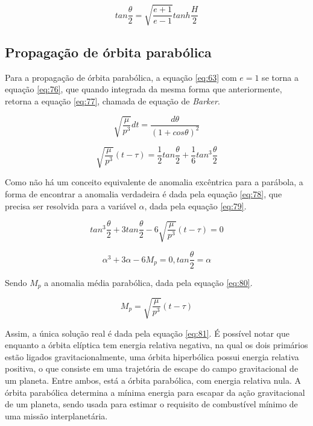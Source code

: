 \begin{equation}
    tan\frac{\theta}{2} = \sqrt{\frac{e+1}{e-1}}tanh\frac{H}{2}
    \label{eq:75}
\end{equation}

\subsection{Propagação de órbita parabólica}

Para a propagação de órbita parabólica, a equação \ref{eq:63} com $e = 1$ se torna a equação \ref{eq:76}, que quando integrada da mesma forma que anteriormente, retorna a equação \ref{eq:77}, chamada de equação de \textit{Barker}.

\begin{equation}
    \sqrt{\frac{\mu}{p^{3}}}dt = \frac{d\theta}{(1+cos\theta)^{2}}
   \label{eq:76} 
\end{equation}

\begin{equation}
    \sqrt{\frac{\mu}{p^{3}}}(t-\tau) = \frac{1}{2}tan\frac{\theta}{2}+\frac{1}{6}tan^{3}\frac{\theta}{2}
    \label{eq:77}
\end{equation}

Como não há um conceito equivalente de anomalia excêntrica para a parábola, a forma de encontrar a anomalia verdadeira é dada pela equação \ref{eq:78}, que precisa ser resolvida para a variável $\alpha$, dada pela equação \ref{eq:79}.

\begin{equation}
    tan^{3} \frac{\theta}{2} + 3tan\frac{\theta}{2}-6\sqrt{\frac{\mu}{p^{3}}}(t-\tau) = 0
    \label{eq:78}
\end{equation}

\begin{equation}
    \alpha^{3}+3\alpha-6M_{p} = 0, tan\frac{\theta}{2} = \alpha
    \label{eq:79}
\end{equation}

Sendo $M_{p}$ a anomalia média parabólica, dada pela equação \ref{eq:80}.

\begin{equation}
    M_{p} = \sqrt{\frac{\mu}{p^{3}}}(t-\tau)
    \label{eq:80}
\end{equation}

Assim, a única solução real é dada pela equação \ref{eq:81}. É possível notar que enquanto a órbita elíptica tem energia relativa negativa, na qual os dois primários estão ligados gravitacionalmente, uma órbita hiperbólica possui energia relativa positiva, o que consiste em uma trajetória de escape do campo gravitacional de um planeta. Entre ambos, está a órbita parabólica, com energia relativa nula. A órbita parabólica determina a mínima energia para escapar da ação gravitacional de um planeta, sendo usada para estimar o requisito de combustível mínimo de uma missão interplanetária. 

